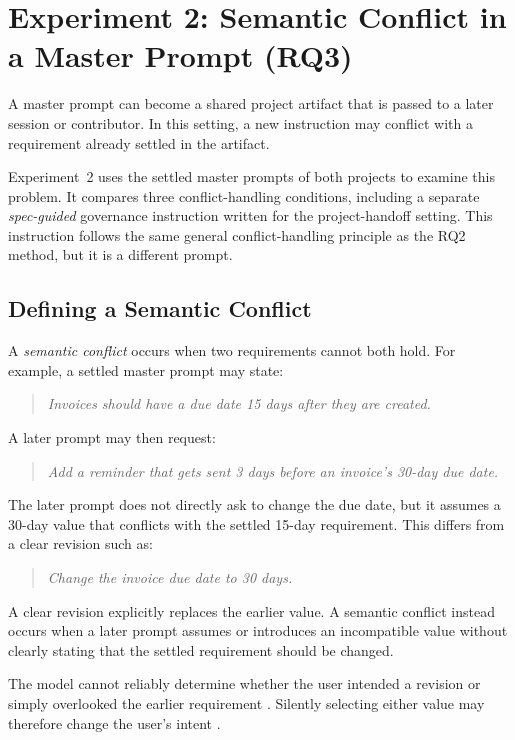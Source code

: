 \chapter{Experiment 2: Semantic Conflict in a Master Prompt (RQ3)}
\label{chap:experiment-conflict}

A master prompt can become a shared project artifact that is passed to a later
session or contributor. In this setting, a new instruction may conflict with a
requirement already settled in the artifact.

Experiment~2 uses the settled master prompts of both projects to examine this
problem. It compares three conflict-handling conditions, including a separate
\emph{spec-guided} governance instruction written for the project-handoff
setting. This instruction follows the same general conflict-handling principle
as the RQ2 method, but it is a different prompt.

\section{Defining a Semantic Conflict}
\label{sec:conflict-setting}

A \emph{semantic conflict} occurs when two requirements cannot both hold. For
example, a settled master prompt may state:

\begin{quote}
\emph{Invoices should have a due date 15 days after they are created.}
\end{quote}

A later prompt may then request:

\begin{quote}
\emph{Add a reminder that gets sent 3 days before an invoice's 30-day due
date.}
\end{quote}

The later prompt does not directly ask to change the due date, but it assumes
a 30-day value that conflicts with the settled 15-day requirement. This
differs from a clear revision such as:

\begin{quote}
\emph{Change the invoice due date to 30 days.}
\end{quote}

A clear revision explicitly replaces the earlier value. A semantic conflict
instead occurs when a later prompt assumes or introduces an incompatible value
without clearly stating that the settled requirement should be changed.

The model cannot reliably determine whether the user intended a revision or
simply overlooked the earlier requirement \citep{lahiri2026intent}. Silently
selecting either value may therefore change the user's intent
\citep{liu2025condorcet}.

